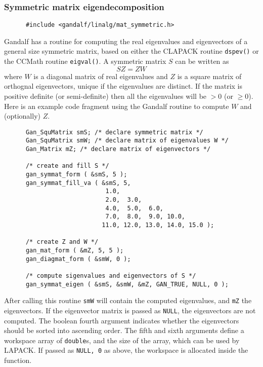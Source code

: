 \subsubsection{Symmetric matrix eigendecomposition}
\begin{verbatim}
      #include <gandalf/linalg/mat_symmetric.h>
\end{verbatim}
Gandalf has a routine for computing the real eigenvalues and eigenvectors of
a general size symmetric matrix, based on either the
CLAPACK routine {\tt dspev()} or the CCMath routine {\tt eigval()}.
A symmetric matrix $S$ can be written as
\[ S Z = Z W
\]
where $W$ is a diagonal matrix of real eigenvalues and $Z$ is a square
matrix of orthognal eigenvectors, unique if the eigenvalues are distinct.
If the matrix is positive definite (or semi-definite) then all the eigenvalues
will be $> 0$ (or $\geq 0$). Here is an example code fragment using the
Gandalf routine to compute $W$ and (optionally) $Z$.
\begin{verbatim}
      Gan_SquMatrix smS; /* declare symmetric matrix */
      Gan_SquMatrix smW; /* declare matrix of eigenvalues W */
      Gan_Matrix mZ; /* declare matrix of eigenvectors */

      /* create and fill S */
      gan_symmat_form ( &smS, 5 );
      gan_symmat_fill_va ( &smS, 5,
                            1.0,
                            2.0,  3.0,
                            4.0,  5.0,  6.0,
                            7.0,  8.0,  9.0, 10.0,
                           11.0, 12.0, 13.0, 14.0, 15.0 );

      /* create Z and W */
      gan_mat_form ( &mZ, 5, 5 );
      gan_diagmat_form ( &smW, 0 );

      /* compute sigenvalues and eigenvectors of S */
      gan_symmat_eigen ( &smS, &smW, &mZ, GAN_TRUE, NULL, 0 );
\end{verbatim}
After calling this routine {\tt smW} will contain the computed eigenvalues,
and {\tt mZ} the eigenvectors. If the eigenvector matrix is passed as
{\tt NULL}, the eigenvectors are not computed. The boolean fourth argument
indicates whether the eigenvectors should be sorted into ascending order.
The fifth and sixth arguments define a workspace array of {\tt double}s,
and the size of the array, which can be used by LAPACK. If passed as
{\tt NULL, 0} as above, the workspace is allocated inside the function.

